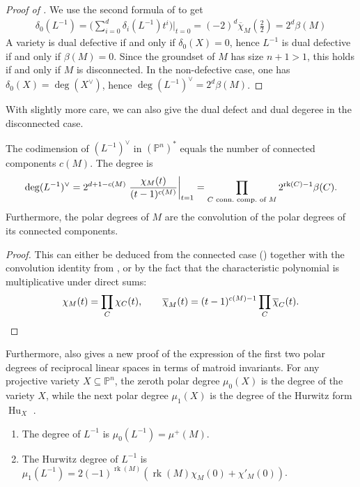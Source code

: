 \documentclass[12pt,a4paper,english]{scrartcl}
\newcommand{\PP}{\mathbb{P}}
\DeclareMathOperator{\rank}{rk}
\begin{document}
\begin{proof}[Proof of ]
We use the second formula of  to get
\begin{align*}
\delta_0(L^{-1})=\bigg(\sum_{i=0}^d\delta_i(L^{-1})t^i\bigg)\bigg|_{t=0}=(-2)^d\overline{\chi}_M\left(\frac{2}{2}\right)=2^d\beta(M)
\end{align*}
A variety is dual defective if and only if $\delta_0(X)=0$, hence $L^{-1}$ is dual defective if and only if $\beta(M) = 0$. Since the groundset of $M$ has size $n+1>1$, this holds if and only if $M$ is disconnected. In the non-defective case, one has $\delta_0(X) = \deg(X^\vee)$, hence $\deg(L^{-1})^\vee = 2^d \beta(M)$.
\end{proof}
With slightly more care, we can also give the dual defect and dual degeree in the disconnected case.
\begin{corollary}
The codimension of $(L^{-1})^\vee$ in $(\PP^n)^*$ equals the number of connected components $c(M)$. The degree is
\[
\deg (L^{-1})^\vee = 2^{d+1-c(M)}\left.\frac{\chi_M(t)}{(t-1)^{c(M)}}\right|_{t=1} = \prod_{C \textup{ conn.\ comp.\ of }M} 2^{\rank(C)-1} \beta(C).
\]
Furthermore, the polar degrees of $M$ are the convolution of the polar degrees of its connected components.
\end{corollary}
\begin{proof}
This can either be deduced from the connected case () together with the convolution identity from , or by the fact that the characteristic polynomial is multiplicative under direct sums:
\[
\chi_M(t) = \prod_{C} \chi_{C}(t), \qquad \overline{\chi}_M(t) = (t-1)^{c(M)-1} \prod_{C} \overline{\chi}_{C}(t). \qedhere
\]
\end{proof}


Furthermore,  also gives a new proof of the expression of the first two polar degrees of reciprocal linear spaces in terms of matroid invariants. For any projective variety $X\subseteq \PP^n$, the zeroth polar degree $\mu_0(X)$ is the degree of the variety $X$, while the next polar degree $\mu_1(X)$ is the degree of the Hurwitz form $\operatorname{Hu}_X$ \cite[Theorem 9]{Kohn2021}.

\begin{corollary}
\begin{enumerate}
\item The degree of $L^{-1}$ is $\mu_0(L^{-1}) = \mu^+(M)$.
\item The Hurwitz degree of $L^{-1}$ is $\mu_1(L^{-1}) = 2(-1)^{\rank(M)}(\rank(M)\chi_M(0) + \chi'_M(0))$.
\end{enumerate}
\end{corollary}
\end{document}
